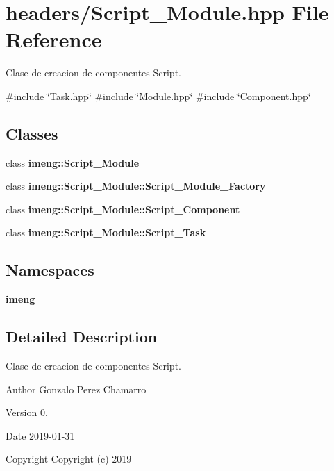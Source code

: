 \section{headers/\+Script\+\_\+\+Module.hpp File Reference}
\label{_script___module_8hpp}


Clase de creacion de componentes Script.  


{\ttfamily \#include \char`\"{}Task.\+hpp\char`\"{}}\newline
{\ttfamily \#include \char`\"{}Module.\+hpp\char`\"{}}\newline
{\ttfamily \#include \char`\"{}Component.\+hpp\char`\"{}}\newline
\subsection*{Classes}
\begin{DoxyCompactItemize}
\item 
class \textbf{ imeng\+::\+Script\+\_\+\+Module}
\item 
class \textbf{ imeng\+::\+Script\+\_\+\+Module\+::\+Script\+\_\+\+Module\+\_\+\+Factory}
\item 
class \textbf{ imeng\+::\+Script\+\_\+\+Module\+::\+Script\+\_\+\+Component}
\item 
class \textbf{ imeng\+::\+Script\+\_\+\+Module\+::\+Script\+\_\+\+Task}
\end{DoxyCompactItemize}
\subsection*{Namespaces}
\begin{DoxyCompactItemize}
\item 
 \textbf{ imeng}
\end{DoxyCompactItemize}


\subsection{Detailed Description}
Clase de creacion de componentes Script. 

\begin{DoxyAuthor}{Author}
Gonzalo Perez Chamarro 
\end{DoxyAuthor}
\begin{DoxyVersion}{Version}
0. 
\end{DoxyVersion}
\begin{DoxyDate}{Date}
2019-\/01-\/31
\end{DoxyDate}
\begin{DoxyCopyright}{Copyright}
Copyright (c) 2019 
\end{DoxyCopyright}
